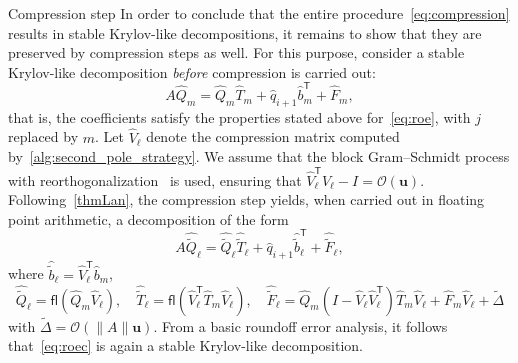 \documentclass{siamart190516}
\newcommand{\Ttran}{\mathsf{T}}
\newcommand{\order}{\mathcal{O}}
\newcommand{\fl}{\mathsf{fl}}
\newcommand{\mpr}{\mathbf{u}}
\providecommand{\norm}[1]{\lVert#1\rVert}
\begin{document}
\begin{paragraph}{Compression step}
    In order to conclude that the entire procedure~\cref{eq:compression} results in stable Krylov-like decompositions, it remains to show that they are preserved by compression steps as well. For this purpose, consider a stable Krylov-like decomposition \emph{before}
    compression is carried out:
\[
    A\widehat{Q}_{m} = \widehat{Q}_{m}\widehat{T}_{m}+\widehat{q}_{i+1}\widehat{b}_{m}^{\Ttran}+\widehat{F}_{m},
\]
that is, the coefficients satisfy the properties stated above for~\cref{eq:roe}, with $j$ replaced by $m$.
Let $\widehat{V}_{\ell}$ denote the compression matrix computed by~\cref{alg:second_pole_strategy}. We assume that the block Gram--Schmidt process with reorthogonalization~\cite{Barlow2013} is used, ensuring that $\widehat{V}_{\ell}^{\Ttran}\widehat{V}_{\ell}-I=\order(\mpr)$.
Following~\cref{thmLan}, the compression step yields, when carried out in floating point arithmetic, a decomposition of the form
    \begin{equation}
        \label{eq:roec}
        A\widehat{\widetilde{Q}}_{\ell} = \widehat{\widetilde{Q}}_{\ell}\widehat{\widetilde{T}}_{\ell}+\widehat{q}_{i+1}\widehat{\widetilde{b}}_{\ell}^{\Ttran}+\widehat{\widetilde{F}}_{\ell},
    \end{equation}
    where $\widehat{\widetilde{b}}_{\ell} = \widehat{V}_{\ell}^{\Ttran}\widehat{b}_{m}$, 
    \begin{equation*}
        \widehat{\widetilde{Q}}_{\ell} = \fl(\widehat{Q}_{m}\widehat{V}_{\ell}),\quad 
        \widehat{\widetilde{T}}_{\ell} = \fl(\widehat{V}_{\ell}^{\Ttran}\widehat{T}_{m}\widehat{V}_{\ell}), \quad 
        \widehat{\widetilde{F}}_{\ell} =  \widehat{Q}_{m}(I-\widehat{V}_{\ell}\widehat{V}_{\ell}^{\Ttran})\widehat{T}_{m}\widehat{V}_{\ell}+\widehat{F}_{m}\widehat{V}_{\ell}+\widetilde{\Delta}
    \end{equation*}
    with $\widetilde{\Delta}=\order(\norm{A}\mpr)$. 
    From a basic roundoff error analysis, it follows that~\cref{eq:roec} is again a stable Krylov-like decomposition. 
\end{paragraph}
\end{document}
